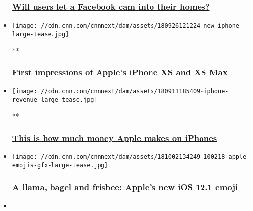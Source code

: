 \begin{itemize}
  \hypertarget{will-users-let-a-facebook-cam-into-their-homes}{%
  \subsubsection{\texorpdfstring{\href{/videos/business/2018/10/05/facebook-portal-orig.cnn-business}{Will
  users let a Facebook cam into their
  homes?}}{Will users let a Facebook cam into their homes?}}\label{will-users-let-a-facebook-cam-into-their-homes}}
\item
  \href{/videos/business/2018/09/26/first-impressions-of-apples-iphone-xs-and-xs-max-orig.cnn-business}{}

  \texttt{[image: //cdn.cnn.com/cnnnext/dam/assets/180926121224-new-iphone-large-tease.jpg]}

  **

  \hypertarget{first-impressions-of-apples-iphone-xs-and-xs-max}{%
  \subsubsection{\texorpdfstring{\href{/videos/business/2018/09/26/first-impressions-of-apples-iphone-xs-and-xs-max-orig.cnn-business}{First
  impressions of Apple's iPhone XS and XS
  Max}}{First impressions of Apple's iPhone XS and XS Max}}\label{first-impressions-of-apples-iphone-xs-and-xs-max}}
\item
  \href{/videos/business/2018/09/20/iphone-revenue-orig.cnn-business}{}

  \texttt{[image: //cdn.cnn.com/cnnnext/dam/assets/180911185409-iphone-revenue-large-tease.jpg]}

  **

  \hypertarget{this-is-how-much-money-apple-makes-on-iphones}{%
  \subsubsection{\texorpdfstring{\href{/videos/business/2018/09/20/iphone-revenue-orig.cnn-business}{This
  is how much money Apple makes on
  iPhones​}}{This is how much money Apple makes on iPhones​}}\label{this-is-how-much-money-apple-makes-on-iphones}}
\item
  \href{/2018/10/02/tech/apple-emoji-ios-12-1-llama/index.html}{}

  \texttt{[image: //cdn.cnn.com/cnnnext/dam/assets/181002134249-100218-apple-emojis-gfx-large-tease.jpg]}

  \hypertarget{a-llama-bagel-and-frisbee-apples-new-ios-121-emoji}{%
  \subsubsection{\texorpdfstring{\href{/2018/10/02/tech/apple-emoji-ios-12-1-llama/index.html}{A
  llama, bagel and frisbee: Apple's new iOS 12.1
  emoji}}{A llama, bagel and frisbee: Apple's new iOS 12.1 emoji}}\label{a-llama-bagel-and-frisbee-apples-new-ios-121-emoji}}
\item
  \href{/2018/10/02/tech/microsoft-surface-computers/index.html}{}


\end{itemize}
